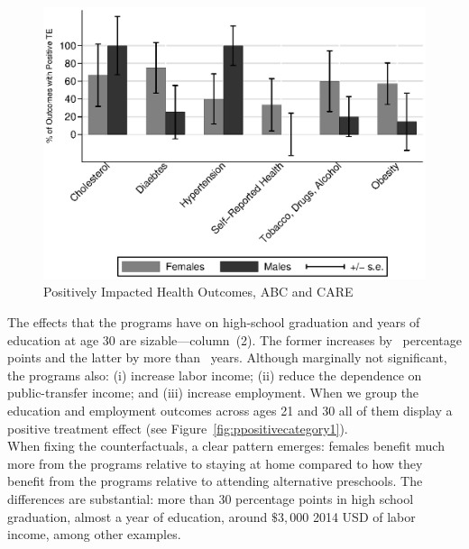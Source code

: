 \begin{figure}[H]
		\caption{Positively Impacted Health Outcomes, ABC and CARE} \label{fig:ppositivecategory2}
		\includegraphics[width=.8\columnwidth]{output/itt_noctrl_cats2.eps}
\end{figure} 

\noindent The effects that the programs have on high-school graduation and years of education at age 30 are sizable---column~(2). The former increases by \hsgradf\ percentage points and the latter by more than \yearsedf\ years. Although marginally not significant, the programs also: (i) increase labor income; (ii) reduce the dependence on public-transfer income; and (iii) increase employment. When we group the education and employment outcomes across ages 21 and 30 all of them display a positive treatment effect (see Figure~\ref{fig:ppositivecategory1}).\\

\noindent When fixing the counterfactuals, a clear pattern emerges: females benefit much more from the programs relative to staying at home compared to how they benefit from the programs relative to attending alternative preschools. The differences are substantial: more than $30$ percentage points in high school graduation, almost a year of education, around $\$ 3,000$ 2014 USD of labor income, among other examples. \\

